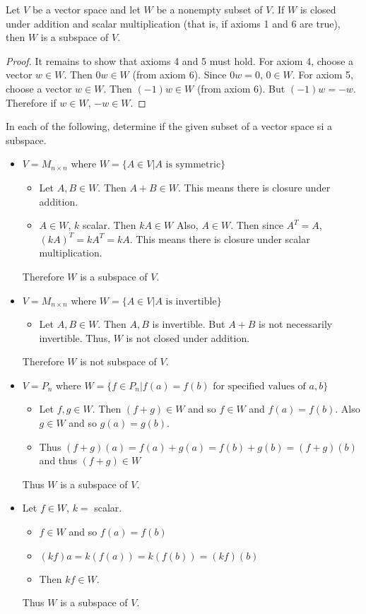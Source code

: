 \documentclass[12pt]{article}
\begin{document}
\begin{theorem} Let $V$ be a vector space and let $W$ be a nonempty subset of $V$. If $W$ is closed under addition and scalar multiplication (that is, if axioms 1 and 6 are true), then $W$ is a subspace of $V$. \end{theorem} \begin{proof} 
It remains to show that axioms 4 and 5 must hold. For axiom 4, choose a vector $w \in W$. Then $0w \in W$ (from axiom 6). Since $0w = 0$, $0 \in W$. For axiom 5, choose a vector $w \in W$. Then $(-1)w \in W$ (from axiom 6). But $(-1)w = -w $. Therefore if $w \in W$, $-w \in W$. \end{proof} 
\begin{example} In each of the following, determine if the given subset of a vector space si a subspace. \begin{itemize} 
\item $V = M_{n \times n}$ where $W = \{A \in V | \text{$A$ is symmetric}\}$ \begin{itemize} \item Let $A, B \in W$. Then $ A + B \in W $. This means there is closure under addition. \item $A \in W$, $k$ scalar. Then $kA \in W$ Also, $A \in W$. Then since $A^T = A$, $(kA)^T = kA^T = kA$. This means there is closure under scalar multiplication. \end{itemize} Therefore $W$ is a subspace of $V$. 
\item $V = M_{n \times n} $ where $W = \{A \in V | \text{$A$ is invertible}\}$ \begin{itemize} \item Let $A, B \in W$. Then $A, B$ is invertible. But $A + B$ is not necessarily invertible. Thus, $W$ is not closed under addition. \end{itemize} Therefore $W$ is not subspace of $V$. 
\item $V = P_n$ where $W = \{ f \in P_n | f(a) = f(b) \text{ for specified values of } a, b\} $ \begin{itemize} \item Let $f, g \in W$. Then $(f + g) \in W$ and so $f \in W$ and $f(a) = f(b)$. Also $g \in W$ and so $g(a) = g(b)$. \item Thus $(f + g)(a) = f(a) + g(a) = f(b) + g(b) = (f + g)(b)$ and thus $(f + g) \in W$ \end{itemize} Thus $W$ is a subspace of $V$. 
\item Let $f \in W$, $k = $ scalar. \begin{itemize} \item $f \in W$ and so $f(a) = f(b)$ \item $(kf)a = k(f(a)) = k(f(b)) = (kf)(b)$ \item Then $kf \in W$. \end{itemize} Thus $W$ is a subspace of $V$. 

\end{itemize}
\end{example}
\end{document}
